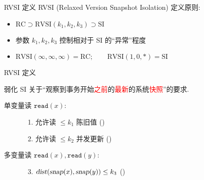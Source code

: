 \begin{frame}{RVSI 定义}
  RVSI {\small (Relaxed Version Snapshot Isolation)} 定义原则:
  \begin{itemize}
    \item<1-> $\text{RC} \supset \text{RVSI}(k_1, k_2, k_3) \supset \text{SI}$
    \item<2-> 参数 $k_1, k_2, k_3$ 控制相对于 SI 的``异常''程度
    \item<2-> $\text{RVSI}(\infty,\infty,\infty) = \text{RC}; \qquad \text{RVSI}(1,0,\ast) = \text{SI}$
  \end{itemize}

  \vspace{0.60cm}

\end{frame}
\begin{frame}{RVSI 定义}
  \begin{cdef}
	弱化 SI 关于``观察到事务开始\textcolor{red}{之前}的\textcolor{red}{最新}的系统\textcolor{red}{快照}''的要求.
	\vspace{5pt}

    \begin{description}
      \item[单变量读 $\texttt{read}(x)$:] \hfill 
        \begin{enumerate}
		  \item 允许读 $\le k_1$ 陈旧值 (\konebv{})
		  \item 允许读 $\le k_2$ 并发更新 (\ktwofv{})
        \end{enumerate}
      \item[多变量读 $\texttt{read}(x), \texttt{read}{(y)}$:] \hfill
        \begin{enumerate}
          \setcounter{enumi}{2}
		\item $\textsl{dist}(\textsl{snap}{(x)},\textsl{snap}{(y)}) \le k_3$ (\kthreesv{})
        \end{enumerate}
    \end{description}
  \end{cdef}
\end{frame}

